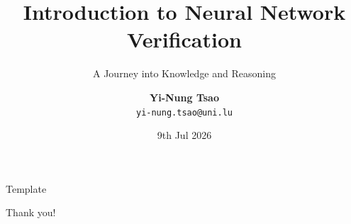 \documentclass[10pt]{beamer}
\title{{\Large Introduction to Neural Network Verification}}
\subtitle{\small A Journey into Knowledge and Reasoning}
\author{\textbf{Yi-Nung Tsao}\\
\texttt{yi-nung.tsao@uni.lu}}
\institute[UNI LU]{University of Luxembourg}
\date[]{9th Jul 2026}
\begin{document}
\maketitle
\begin{frame}{Template}
    
\end{frame}

\begin{frame}[standout]
    Thank you! 
\end{frame}


\end{document}

